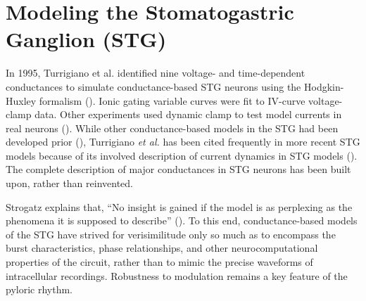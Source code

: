 \documentclass[14pt]{article}
\begin{document}
	\section{Modeling the Stomatogastric Ganglion (STG)}
	In 1995, Turrigiano et al. identified nine voltage- and time-dependent conductances to simulate conductance-based STG neurons using the Hodgkin-Huxley formalism (\cite{Hodgkincomponentsmembraneconductance1952,HodgkinMeasurementcurrentvoltagerelations1952,Hodgkinquantitativedescriptionmembrane1952,FosterSignificanceconductancesHodgkinHuxley1993,TurrigianoSelectiveregulationcurrent1995}). Ionic gating variable curves were fit to IV-curve voltage-clamp data. Other experiments used dynamic clamp to test model currents in real neurons (\cite{SharpDynamicclampcomputergenerated1993,DestexheDynamicClampPrinciplesApplications2009}). While other conductance-based models in the STG had been developed prior (\cite{LeMassonActivityDependentRegulationConductances1993,AbbottAnalysisNeuronModels1993}), Turrigiano \textit{et al.} has been cited frequently in more recent STG models because of its involved description of current dynamics in STG models (\cite{Liumodelneuronactivitydependent1998,PrinzAlternativehandtuningconductancebased2003,PrinzSimilarnetworkactivity2004,PrinzComputationalapproachesneuronal2010,SoofiPhasemaintenancerhythmic2014}). The complete description of major conductances in STG neurons has been built upon, rather than reinvented.
	
	Strogatz explains that, “No insight is gained if the model is as perplexing as the phenomena it is supposed to describe” (\cite{StrogatzSyncEmergingScience2003}). To this end, conductance-based models of the STG have strived for verisimilitude only so much as to encompass the burst characteristics, phase relationships, and other neurocomputational properties of the circuit, rather than to mimic the precise waveforms of intracellular recordings. Robustness to modulation remains a key feature of the pyloric rhythm.
	
\end{document}
